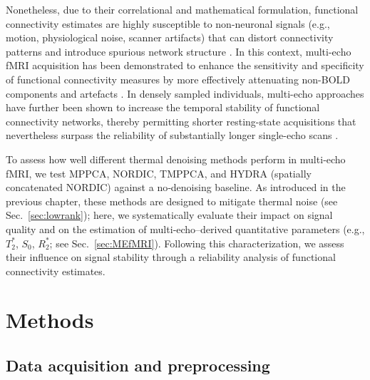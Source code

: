 Nonetheless, due to their correlational and mathematical formulation, functional connectivity estimates are highly susceptible to non-neuronal signals (e.g., motion, physiological noise, scanner artifacts) that can distort connectivity patterns and introduce spurious network structure \citep{satterthwaiteImpactScannerHead2012,powerSpuriousSystematicCorrelations2012}. In this context, multi-echo fMRI acquisition has been demonstrated to enhance the sensitivity and specificity of functional connectivity measures by more effectively attenuating non-BOLD components and artefacts \citep{dipasqualeComparingRestingState2017a, kundu2017multi, kunduIntegratedStrategyImproving2013a}. In densely sampled individuals, multi-echo approaches have further been shown to increase the temporal stability of functional connectivity networks, thereby permitting shorter resting-state acquisitions that nevertheless surpass the reliability of substantially longer single-echo scans \citep{lynchRapidPrecisionFunctional2020}.

To assess how well different thermal denoising methods perform in multi‑echo fMRI, we test MPPCA, NORDIC, TMPPCA, and HYDRA (spatially concatenated NORDIC) against a no‑denoising baseline. As introduced in the previous chapter, these methods are designed to mitigate thermal noise (see Sec.~\ref{sec:lowrank}); here, we systematically evaluate their impact on signal quality and on the estimation of multi‑echo–derived quantitative parameters (e.g., $T_2^*$, $S_0$, $R_2^*$; see Sec.~\ref{sec:MEfMRI}). Following this characterization, we assess their influence on signal stability through a reliability analysis of functional connectivity estimates.


\section{Methods}

\subsection{Data acquisition and preprocessing}
\label{ImageParametersN}

